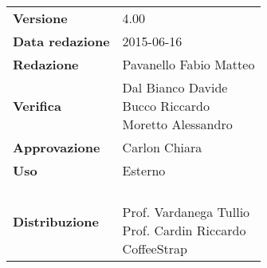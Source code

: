 \documentclass[a4paper]{article}
\begin{document}
			\pagestyle{roman}
			
			\newpage
			

				\begin{center}
					\tabulinesep=6pt
					\begin{tabu} {X[r]|X[l]}
						\textbf{Versione} & 4.00 \\
						\textbf{Data redazione} & 2015-06-16 \\
						\textbf{Redazione} & \parbox[t]{0.4\textwidth}{Pavanello Fabio Matteo} \\
						\textbf{Verifica} & \parbox[t]{0.4\textwidth}{Dal Bianco Davide \\ Bucco Riccardo \\ Moretto Alessandro} \\
						\textbf{Approvazione} & \parbox[t]{0.4\textwidth}{Carlon Chiara} \\
						\textbf{Uso} & Esterno \\
						\textbf{Distribuzione} & \parbox[t]{0.4\textwidth}{\groupname{} \\ Prof. Vardanega Tullio \\ Prof. Cardin Riccardo \\ CoffeeStrap} \\
					\end{tabu}
				\end{center}

	
			\newpage
			
\end{document}

